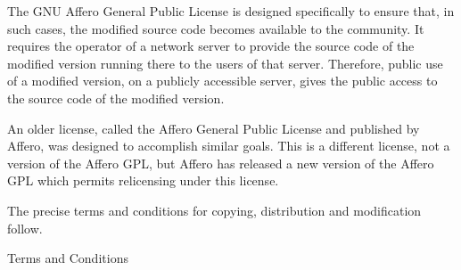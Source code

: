\documentclass{article}%
\begin{document}
The GNU Affero General Public License is designed specifically to
ensure that, in such cases, the modified source code becomes available
to the community.  It requires the operator of a network server to
provide the source code of the modified version running there to the
users of that server.  Therefore, public use of a modified version, on
a publicly accessible server, gives the public access to the source
code of the modified version.

An older license, called the Affero General Public License and
published by Affero, was designed to accomplish similar goals.  This is
a different license, not a version of the Affero GPL, but Affero has
released a new version of the Affero GPL which permits relicensing under
this license.

The precise terms and conditions for copying, distribution and
modification follow.

\begin{center}
{\Large \sc Terms and Conditions}
\end{center}
\end{document}
